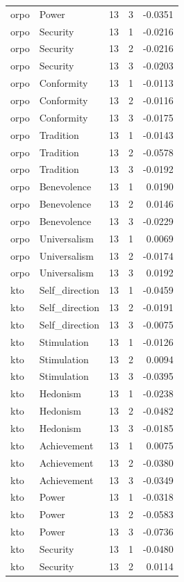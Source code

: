 \begin{tabular}{llrrr}
orpo & Power & 13 & 3 & -0.0351 \\
orpo & Security & 13 & 1 & -0.0216 \\
orpo & Security & 13 & 2 & -0.0216 \\
orpo & Security & 13 & 3 & -0.0203 \\
orpo & Conformity & 13 & 1 & -0.0113 \\
orpo & Conformity & 13 & 2 & -0.0116 \\
orpo & Conformity & 13 & 3 & -0.0175 \\
orpo & Tradition & 13 & 1 & -0.0143 \\
orpo & Tradition & 13 & 2 & -0.0578 \\
orpo & Tradition & 13 & 3 & -0.0192 \\
orpo & Benevolence & 13 & 1 & 0.0190 \\
orpo & Benevolence & 13 & 2 & 0.0146 \\
orpo & Benevolence & 13 & 3 & -0.0229 \\
orpo & Universalism & 13 & 1 & 0.0069 \\
orpo & Universalism & 13 & 2 & -0.0174 \\
orpo & Universalism & 13 & 3 & 0.0192 \\
kto & Self\_direction & 13 & 1 & -0.0459 \\
kto & Self\_direction & 13 & 2 & -0.0191 \\
kto & Self\_direction & 13 & 3 & -0.0075 \\
kto & Stimulation & 13 & 1 & -0.0126 \\
kto & Stimulation & 13 & 2 & 0.0094 \\
kto & Stimulation & 13 & 3 & -0.0395 \\
kto & Hedonism & 13 & 1 & -0.0238 \\
kto & Hedonism & 13 & 2 & -0.0482 \\
kto & Hedonism & 13 & 3 & -0.0185 \\
kto & Achievement & 13 & 1 & 0.0075 \\
kto & Achievement & 13 & 2 & -0.0380 \\
kto & Achievement & 13 & 3 & -0.0349 \\
kto & Power & 13 & 1 & -0.0318 \\
kto & Power & 13 & 2 & -0.0583 \\
kto & Power & 13 & 3 & -0.0736 \\
kto & Security & 13 & 1 & -0.0480 \\
kto & Security & 13 & 2 & 0.0114 \\

\end{tabular}
